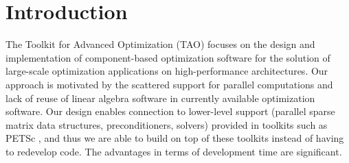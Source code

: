 \section{Introduction}

The Toolkit for Advanced Optimization (TAO)
focuses on the design and implementation of
component-based optimization software for the
solution of large-scale optimization applications
on high-performance architectures.
Our approach is motivated by the
scattered support for parallel computations and
lack of reuse of linear algebra software in
currently available optimization software.
Our design enables connection to lower-level
support (parallel sparse matrix data
structures, preconditioners, solvers) provided in toolkits such as
PETSc \cite{petsc,PETSc-user-ref},
and thus we are able to build on top of these toolkits
instead of having to redevelop code. The advantages in
terms of development time are significant.

